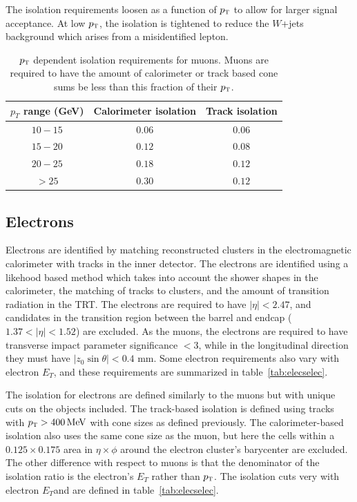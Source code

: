 The isolation requirements loosen as a function of $p_{\textrm{\footnotesize\sc t}}$ to allow for larger signal acceptance. At low $p_{\textrm{\footnotesize\sc t}}$, the isolation is tightened to reduce the $W$+jets background which arises from a misidentified lepton. 

\begin{table}[h!]
\centering
\captionsetup{justification=centering}

\hspace{-10pt}
\begin{tabular}{|c|c|c|}
\hline
$p_T$ range (GeV) & Calorimeter isolation & Track isolation\\ \hline \hline
$10-15$ & $0.06$ & $0.06$ \\ \hline
$15-20$ & $0.12$ & $0.08$ \\ \hline
$20-25$ & $0.18$ & $0.12$ \\ \hline
$> 25$ & $0.30$ & $0.12$ \\ \hline
\end{tabular}

\caption{
$p_{\textrm{\footnotesize\sc t}}$ dependent isolation requirements for muons. Muons are required to have the amount of calorimeter or track based cone sums be less than this fraction of their $p_{\textrm{\footnotesize\sc t}}$.
}
\label{tab:muonisocuts}
\end{table}

\subsection{Electrons}

Electrons are identified by matching reconstructed clusters in the electromagnetic calorimeter with tracks in the inner detector. The electrons are identified using a likehood based method\cite{ElectronReco,GSF} which takes into account the shower shapes in the calorimeter, the matching of tracks to clusters, and the amount of transition radiation in the TRT. The electrons are required to have $|\eta| < 2.47$, and candidates in the transition region between the barrel and endcap ($1.37 < |\eta| < 1.52$) are excluded. As the muons, the electrons are required to have transverse impact parameter significance $ < 3$, while in the longitudinal direction they must have $|z_0 \sin \theta| < 0.4$ mm. Some electron requirements also vary with electron $E_{T}$, and these requirements are summarized in table~\ref{tab:elecselec}.

The isolation for electrons are defined similarly to the muons but with unique cuts on the objects included. The track-based isolation is defined using tracks with $\pT > 400 \MeV$ with cone sizes as defined previously. The calorimeter-based isolation also uses the same cone size as the muon, but here the cells within a $0.125 \times 0.175$ area in $\eta \times \phi$ around the electron cluster's barycenter are excluded. The other difference with respect to muons is that the denominator of the isolation ratio is the electron's $E_{T}$ rather than $p_{\textrm{\footnotesize\sc t}}$. The isolation cuts very with electron $E_{T}$and are defined in table~\ref{tab:elecselec}. 

